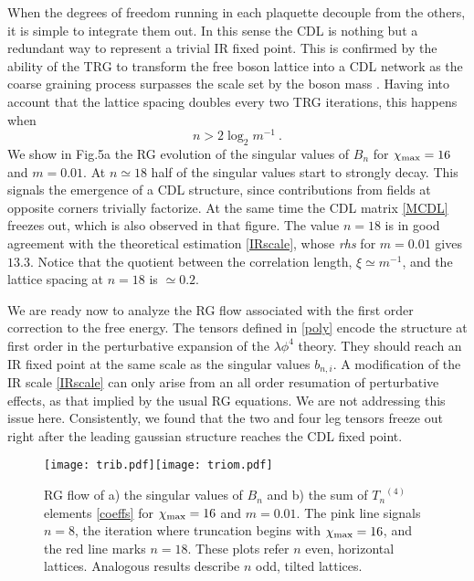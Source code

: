 \documentclass[a4paper,preprintnumbers,nofootinbib,twocolumn]{quantumarticle}
\newcommand{\be}{\begin{equation}} \newcommand{\ee}{\end{equation}}
\begin{document}
When the degrees of freedom running in each plaquette decouple from the others, it is simple to integrate them out. In this sense the CDL is nothing but a redundant way to represent a trivial IR fixed point. This is confirmed by the ability of the TRG to transform the free boson lattice into a CDL network as the coarse graining process surpasses the scale set by the boson mass \cite{CS19}.
Having into account that the lattice spacing doubles every two TRG iterations, this happens when
\be
n > 2 \log_2 m^{-1} \ .
\label{IRscale}
\ee
We show in Fig.5a the RG evolution of the singular values of $B_n$ for $\chi_{\rm max}=16$ and $m=0.01$.  
At $n \simeq 18$ half of the singular values 
start to strongly decay. 
This signals the emergence of a CDL structure, since contributions from fields at opposite corners trivially factorize.
At the same time the CDL matrix \eqref{MCDL} freezes out, which is also observed in that figure.
The value $n=18$ is in good agreement with the theoretical estimation \eqref{IRscale}, whose {\it rhs} for $m=0.01$ gives $13.3$.
Notice that the quotient between the correlation length, $\xi \simeq m^{-1}$, and the lattice spacing at $n=18$ is $ \simeq 0.2$.

We are ready now to analyze the RG flow associated with the first order correction to the free energy. 
The tensors defined in \eqref{poly} encode the structure at first order in the perturbative expansion of the $\lambda \phi^4$ theory.
They should reach an IR fixed point at the same scale as the 
singular values $b_{n,i}$. 
A modification of the IR scale \eqref{IRscale} can only arise from an all order resumation of perturbative effects, as that implied by the usual RG equations.
We are not addressing this issue here. 
Consistently, we found that the two and four leg tensors freeze out right after the leading gaussian structure reaches the CDL fixed point. 

\vspace*{-2mm}
\begin{figure}[h]
\begin{center}
\texttt{[image: trib.pdf]}\texttt{[image: triom.pdf]}
\end{center}
\vspace*{-5mm}
\caption{\label{fig:fe3} RG flow of a) the singular values of $B_n$ and b) the sum of ${T_n}^{(4)}$ elements \eqref{coeffs} for $\chi_{\rm max}=16$ and $m=0.01$. The pink line signals $n=8$, the iteration where truncation begins with $\chi_{\rm max}=16$, and the red line marks $n=18$. These plots refer $n$ even, horizontal lattices. Analogous results describe $n$ odd, tilted lattices.}
\end{figure}
\end{document}
